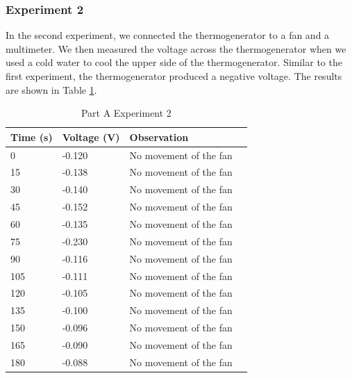 \documentclass[a4paper, 12pt, english]{article}
\begin{document}
\subsubsection{Experiment 2}
In the second experiment, we connected the thermogenerator to a fan and a
multimeter. We then measured the voltage across the thermogenerator when we
used a cold water to cool the upper side of the thermogenerator. Similar to the
first experiment, the thermogenerator produced a negative voltage. The results
are shown in Table \ref{tab:partA2}.
\begin{table}[H]
	\centering
	\caption{Part A Experiment 2}
	\label{tab:partA2}
	\begin{tabular}{@{}llll@{}}
		\toprule
		\textbf{Time (s)} & \textbf{Voltage (V)} & \textbf{Observation}   \\ \midrule
		0                 & -0.120               & No movement of the fan \\
		15                & -0.138               & No movement of the fan \\
		30                & -0.140               & No movement of the fan \\
		45                & -0.152               & No movement of the fan \\
		60                & -0.135               & No movement of the fan \\
		75                & -0.230               & No movement of the fan \\
		90                & -0.116               & No movement of the fan \\
		105               & -0.111               & No movement of the fan \\
		120               & -0.105               & No movement of the fan \\
		135               & -0.100               & No movement of the fan \\
		150               & -0.096               & No movement of the fan \\
		165               & -0.090               & No movement of the fan \\
		180               & -0.088               & No movement of the fan \\ \bottomrule
	\end{tabular}
\end{table}
\end{document}
